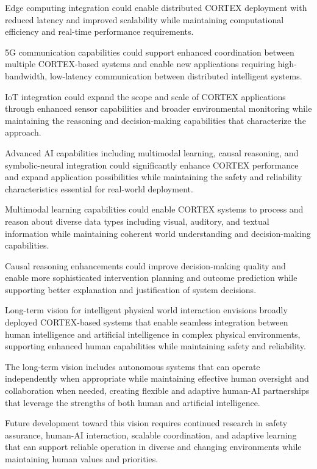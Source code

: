 Edge computing integration could enable distributed CORTEX deployment with reduced latency and improved scalability while maintaining computational efficiency and real-time performance requirements.

5G communication capabilities could support enhanced coordination between multiple CORTEX-based systems and enable new applications requiring high-bandwidth, low-latency communication between distributed intelligent systems.

IoT integration could expand the scope and scale of CORTEX applications through enhanced sensor capabilities and broader environmental monitoring while maintaining the reasoning and decision-making capabilities that characterize the approach.

Advanced AI capabilities including multimodal learning, causal reasoning, and symbolic-neural integration could significantly enhance CORTEX performance and expand application possibilities while maintaining the safety and reliability characteristics essential for real-world deployment.

Multimodal learning capabilities could enable CORTEX systems to process and reason about diverse data types including visual, auditory, and textual information while maintaining coherent world understanding and decision-making capabilities.

Causal reasoning enhancements could improve decision-making quality and enable more sophisticated intervention planning and outcome prediction while supporting better explanation and justification of system decisions.

Long-term vision for intelligent physical world interaction envisions broadly deployed CORTEX-based systems that enable seamless integration between human intelligence and artificial intelligence in complex physical environments, supporting enhanced human capabilities while maintaining safety and reliability.

The long-term vision includes autonomous systems that can operate independently when appropriate while maintaining effective human oversight and collaboration when needed, creating flexible and adaptive human-AI partnerships that leverage the strengths of both human and artificial intelligence.

Future development toward this vision requires continued research in safety assurance, human-AI interaction, scalable coordination, and adaptive learning that can support reliable operation in diverse and changing environments while maintaining human values and priorities.

